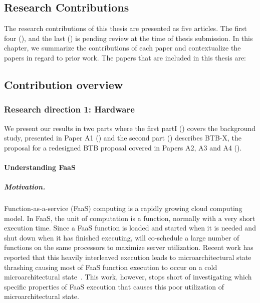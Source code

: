 \documentclass[../main.tex]{subfiles}
\begin{document}
\ifx\chapincluded\undefined
  \begin{refsection}
 \fi

 \chapter{Research Contributions}
\label{chap:rcontrib}

The research contributions of this thesis are presented as five articles. The first four (), and the last () is pending review at the time of thesis submission. In this chapter, we summarize the contributions of each paper and contextualize the papers in regard to prior work. The papers that are included in this thesis are:




\section{Contribution overview}

\subsection{Research direction 1: Hardware}
We present our results in two parts where the first partI
() covers the
background study, presented in Paper A1 () and
the second part () describes BTB-X, the proposal for a
redesigned BTB proposal covered in Papers
A2, A3 and A4 ().

\subsubsection{Understanding FaaS}
\label{subsub:understanding}
\paragraph{Motivation.} Function-as-a-service (FaaS) computing is a rapidly growing cloud computing model. In FaaS, the unit of computation is a function, normally with a very short execution time. Since a FaaS function is loaded and started when it is needed and shut down when it has finished executing, will co-schedule a large number of functions on the same processors to maximize server utilization. Recent work has reported that this heavily interleaved execution leads to microarchitectural state thrashing causing most of FaaS function execution to occur on a cold microarchitectural state~\cite{shahrad19_archit_implic_funct_servic_comput,lukewarm_serverless}. This work, however, stops short of investigating which specific properties of FaaS execution that causes this poor utilization of microarchitectural state.


\end{refsection}
\end{document}
